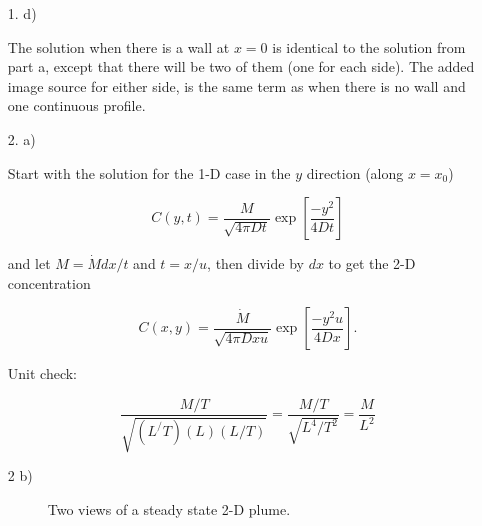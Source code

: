 \documentclass[11pt]{article}
\begin{document}
\begin{enumerate}
\item[1. d)]

The solution when there is a wall at $x=0$ is identical to the solution from part a, except that there will be two of them (one for each side).  The added image source for either side, is the same term as when there is no wall and one continuous profile. 

\clearpage
\item[2. a)]  

Start with the solution for the 1-D case in the $y$ direction (along $x=x_0$)

$$C(y,t) = \frac{M}{\sqrt{4\pi Dt}}\exp\left[{\frac{-y^2}{4Dt}}\right]$$

and let $M=\dot{M}dx/t$ and $t=x/u$,  then divide by $dx$ to get the 2-D concentration

$$C(x,y) = \frac{\dot{M}}{\sqrt{4\pi Dxu}}\exp\left[{\frac{-y^2u}{4Dx}}\right].$$

Unit check:

$$\frac{M/T}{\sqrt{(L^/T)(L)(L/T)}}=\frac{M/T}{\sqrt{L^4/T^2}}=\frac{M}{L^2}$$

\item[2 b)]

\begin{figure}[!htbp]
   \centering
   \caption{Two views of a steady state 2-D plume.}
\end{figure}


\end{enumerate}
\end{document}
